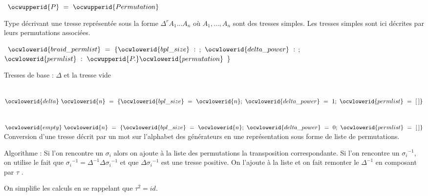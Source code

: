 \documentclass[12pt]{article}
\begin{document}
\allowbreak\ocwsection
\label{Canonical.ml:0}%
\label{Canonical.ml:97}%
\medskip
\ocwbegincode{}\ocwindent{0.00em}
~$\ocwupperid{P}~=~\ocwupperid{Permutation}$\medskip

\ocwendcode{}\ocwindent{0.00em}
Type décrivant une tresse représentée sous la forme $\Delta^r A_1...A_n$ où
   $A_1,...,A_n$ sont des tresses simples. Les tresses simples sont ici décrites
   par leurs permutations associées.

\ocweol
\label{Canonical.ml:330}%
\medskip
\ocwbegincode{}\ocwindent{0.00em}
~$\ocwlowerid{braid\_permlist}~=~\{\ocwlowerid{bpl\_size}~:~$;~$\ocwlowerid{delta\_power}~:~$;~$\ocwlowerid{permlist}~:~\ocwupperid{P.}\ocwlowerid{permutation}~$\}\medskip

\ocwendcode{}\ocwindent{0.00em}
Tresses de base : $\Delta$ et la tresse vide

\ocweol
\label{Canonical.ml:473}%
\medskip
\ocwbegincode{}\ocwindent{0.00em}
~$\ocwlowerid{delta}~\ocwlowerid{n}~=~\{\ocwlowerid{bpl\_size}~=~\ocwlowerid{n};~\ocwlowerid{delta\_power}~=~1;~\ocwlowerid{permlist}~=~[\,]\}$\medskip

\label{Canonical.ml:536}%
\ocwindent{0.00em}
~$\ocwlowerid{empty}~\ocwlowerid{n}~=~\{\ocwlowerid{bpl\_size}~=~\ocwlowerid{n};~\ocwlowerid{delta\_power}~=~0;~\ocwlowerid{permlist}~=~[\,]\}$\ocweol
\ocwendcode{}\allowbreak\ocwsection
\label{Canonical.ml:602}%
Conversion d'une tresse décrit par un mot sur l'alphabet des générateurs
   en une représentation sous forme de liste de permutations.
   
   Algorithme : Si l'on rencontre un $\sigma _i$ alors on ajoute à la liste des
   permutations la transposition correspondante.
   Si l'on rencontre un ${\sigma _i}^{-1}$, on utilise le fait que
   ${\sigma _i}^{-1} = \Delta^{-1} \Delta {\sigma _i}^{-1}$ et que $\Delta {\sigma _i}^{-1}$
   est une tresse positive. On l'ajoute à la liste et on fait remonter le $\Delta^{-1}$
   en composant par $\tau$ .
   
   On simplifie les calculs en se rappelant que $\tau^2 = id$.
\end{document}

